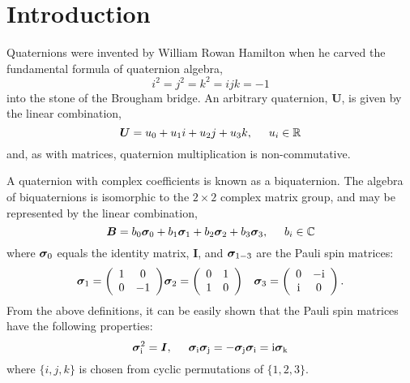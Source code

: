 \documentclass[12pt]{article}
\newcommand{\Ci}{{\rm i}}
\newcommand{\C}{\mathbb{C}}
\newcommand{\R}{\mathbb{R}}
\newcommand{\pauli}[1]{\ensuremath{ {\bm\sigma}_{\rm #1} }}
\begin{document}
\section{Introduction}

Quaternions were invented by William Rowan Hamilton when he carved the
fundamental formula of quaternion algebra,
\begin{equation}
i^2=j^2=k^2=ijk=-1
\end{equation}
into the stone of the Brougham bridge.
An arbitrary quaternion, $\bm{U}$, is given by the linear combination,
\begin{equation}
\bm{U}=u_0+u_1i+u_2j+u_3k, \hspace{5mm} u_i\in\R
\end{equation}
and, as with matrices, quaternion multiplication is non-commutative.

A quaternion with complex coefficients is known as a biquaternion.
The algebra of biquaternions is isomorphic to the $2\times2$ complex
matrix group, and may be
represented by the linear combination,
\begin{equation}
\bm{B}=b_0\pauli{0}+b_1\pauli{1}+b_2\pauli{2}+b_3\pauli{3},\hspace{5mm}b_i\in\C
\end{equation}
where $\pauli{0}$ equals the identity matrix, $\bm{I}$, and $\pauli{1-3}$
are the Pauli spin matrices:
\begin{eqnarray}
\pauli{1} = \left( \begin{array}{cc}
1 & 0 \\
0 & -1 
\end{array}\right)
&
\pauli{2} = \left( \begin{array}{cc}
0 & 1 \\
1 & 0 
\end{array}\right)
& 
\pauli{3} = \left( \begin{array}{cc}
0 & -\Ci \\
\Ci & 0
\end{array}\right).
\label{eqn:pauli}
\end{eqnarray}
From the above definitions, it can be easily shown that the Pauli spin
matrices have the following properties:
\begin{equation}\label{eqn:properties}
\pauli{i}^2 = \bm{I}, \hspace{5mm} 
\pauli{i}\pauli{j} = -\pauli{j}\pauli{i} = \Ci\pauli{k}
\end{equation}
where $\{i,j,k\}$ is chosen from cyclic permutations of $\{1,2,3\}$.
\end{document}

